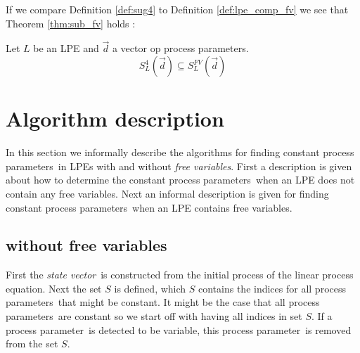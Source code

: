 \index{}\documentclass[a4paper,10pt]{article}
\theoremstyle{plain}
\theoremstyle{definition}
\newcommand{\lpe}{linear process equation}
\newcommand{\ovr}{\overrightarrow}
\newcommand{\pp}{process parameter}
\newcommand{\pps}{process parameters}
\newcommand{\ti}{\textit}
\newcommand{\tb}{\textbf}
\newcommand{\sv}{\textit{state vector}}
\begin{document}
If we compare Definition \ref{def:sug4} to Definition \ref{def:lpe_comp_fv} we see that Theorem \ref{thm:sub_fv} holds :
\begin{thm}\label{thm:sub_fv} Let $L$ be an LPE and $\ovr{d}$ a vector op \pps . 
$$S_L^4(\ovr{d}) \subseteq S_L^{FV}(\ovr{d}) $$
\end{thm} 




\section{Algorithm description}
In this section we informally describe the algorithms for finding constant \pps\ in LPEs with and without \ti{free variables}. First a description is given about how to determine the constant \pps\ when an LPE does not contain any free variables. Next an informal description is given for finding constant \pps\ when an LPE contains free variables.

\subsection{without free variables}\label{alg:org}

First the \sv\ is constructed from the initial process of the \lpe. Next the set $S$ is defined, which $S$ contains the indices for all \pps\ that might be constant. It might be the case that all \pps\ are constant so we start off with having all indices in set $S$. If a \pp\ is detected to be variable, this \pp\ is removed from the set $S$.
\end{document}
